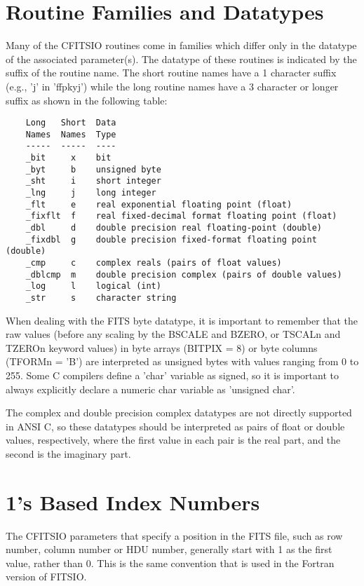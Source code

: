 \section{Routine Families and Datatypes}

Many of the CFITSIO routines come in families which differ only in the
datatype of the associated parameter(s).  The datatype of these
routines is indicated by the suffix of the routine name.  The short
routine names have a 1 character suffix (e.g., 'j' in 'ffpkyj')
while the long routine names have a 3 character or longer suffix
as shown in the following table:

\begin{verbatim}
    Long   Short  Data
    Names  Names  Type
    -----  -----  ----
    _bit     x    bit
    _byt     b    unsigned byte
    _sht     i    short integer
    _lng     j    long integer
    _flt     e    real exponential floating point (float)
    _fixflt  f    real fixed-decimal format floating point (float)
    _dbl     d    double precision real floating-point (double)
    _fixdbl  g    double precision fixed-format floating point (double)
    _cmp     c    complex reals (pairs of float values)
    _dblcmp  m    double precision complex (pairs of double values)
    _log     l    logical (int)
    _str     s    character string
\end{verbatim}
When dealing with the FITS byte datatype, it is important to remember that
the raw values (before any scaling by the BSCALE and BZERO, or TSCALn
and TZEROn keyword values) in byte arrays (BITPIX = 8) or byte columns
(TFORMn = 'B') are interpreted as unsigned bytes with values ranging
from 0 to 255.  Some C compilers define a 'char' variable as signed, so
it is important to always explicitly declare a numeric char variable as
'unsigned char'.

The complex and double precision complex datatypes are not directly
supported in ANSI C, so these datatypes should be interpreted as pairs
of float or double values, respectively, where the first  value in each
pair is the real part, and the second is the imaginary part.


\section{1's Based Index Numbers}

The CFITSIO parameters that specify a position in the FITS file, such
as row number, column number or HDU number, generally start with 1 as
the first value, rather than 0.  This is the same convention that is
used in the Fortran version of FITSIO.


